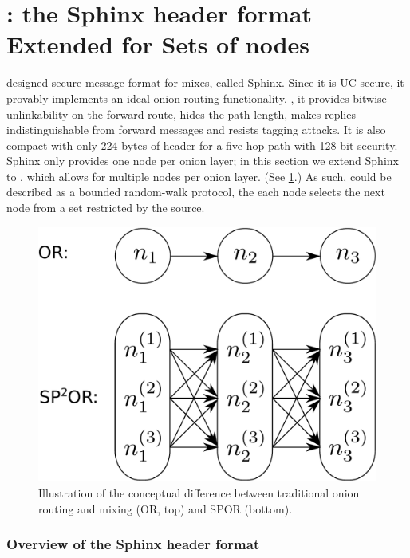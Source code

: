 
\section{\Sphinxes: the Sphinx header format Extended for Sets of nodes}%
\label{Sphinxes}

\Textcite{Sphinx} designed  secure message format for mixes, called 
Sphinx.
Since it is \ac{UC} secure, it provably implements an ideal onion routing 
functionality.
\Ie, it provides bitwise unlinkability on the forward route, hides the path 
length, makes replies indistinguishable from forward messages and resists 
tagging attacks.
It is also compact with only 224 bytes of header for a five-hop path with 
128-bit security. 
Sphinx only provides one node per onion layer; in this section we extend \ac{Sphinx} 
to \Sphinxes, which allows for multiple nodes per onion layer.
(See \cref{fig:OR-POR}.)
As such, \Sphinxes could be described as a bounded random-walk protocol, \ie the 
each node selects the next node from a set restricted by the source.

\begin{figure}
  \centering
    \includegraphics[width=0.65\linewidth]{figures/principle_SPOR.pdf}
  \caption{\label{fig:OR-POR}%
    Illustration of the conceptual difference between traditional onion routing 
and mixing (OR, top) and \ac{SPOR} (bottom).
  }
\end{figure}

\subsubsection{Overview of the Sphinx header format}

